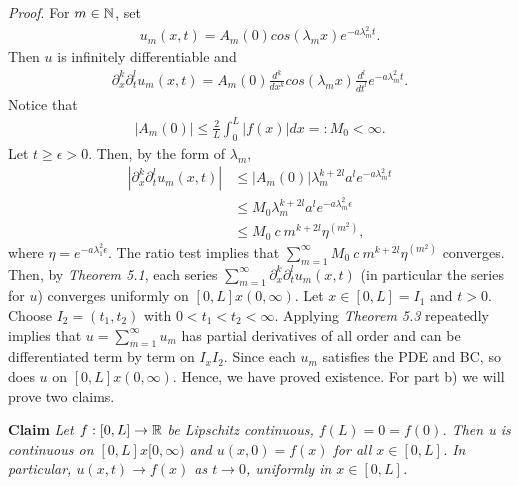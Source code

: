 \begin{questions}
\begin{solution}
\textit{Proof}. For $m\in\mathbb{N}$, set
\begin{align*}
u_m(x,t)=A_m(0)cos(\lambda_mx)e^{-a\lambda_m^2t}.
\end{align*}
Then $u$ is infinitely differentiable and 
\begin{align*}
\partial_x^k\partial_t^lu_m(x,t)=A_m(0)\frac{d^k}{dx^k}cos(\lambda_mx)\frac{d^l}{dt^l}e^{-a\lambda_m^2t}.
\end{align*}
Notice that
\begin{align*}
|A_m(0)|\leq \frac{2}{L}\int_0^L|f(x)|dx=:M_0<\infty.
\end{align*}
Let $t\geq\epsilon>0$. Then, by the form of $\lambda_m$,
\begin{align*}
\left|\partial_x^k\partial_t^lu_m(x,t)\right|&\leq |A_m(0)|\lambda_m^{k+2l}a^le^{-a\lambda_m^2t}\\
&\leq M_0\lambda_m^{k+2l}a^le^{-a\lambda_m^2\epsilon}\\
&\leq M_0~c~m^{k+2l}\eta^{(m^2)},
\end{align*}
where $\eta=e^{-a\lambda_1^2\epsilon}$. The ratio test implies that $\sum_{m=1}^{\infty}M_0~c~m^{k+2l}\eta^{(m^2)}$ converges. Then, by \textsl{Theorem 5.1}, each series $\sum_{m=1}^{\infty}\partial_x^k\partial_t^lu_m(x,t)$ (in particular the series for $u$) converges uniformly on $[0,L]x(0,\infty)$. Let $x\in[0,L]=I_1$ and $t>0$. Choose $I_2=(t_1,t_2)$ with $0<t_1<t_2<\infty$. Applying \textsl{Theorem 5.3} repeatedly implies that $u=\sum_{m=1}^{\infty}u_m$ has partial derivatives of all order and can be differentiated term by term on $I_xI_2$. Since each $u_m$ satisfies the PDE and BC, so does $u$ on $[0,L]x(0,\infty)$. Hence, we have proved existence. For part b) we will prove two claims.


\textbf{Claim} \textit{Let $f : [0, L]\rightarrow \mathbb{R}$ be Lipschitz continuous, $f(L) = 0 = f(0)$. Then u is continuous on $[0, L]x[0,\infty)$ and $u(x, 0) = f(x)$ for all $x\in [0, L]$. In particular, $u(x, t)\rightarrow f(x)$ as $t\rightarrow 0$, uniformly in $x\in [0, L]$.}


\end{solution}
\end{questions}
